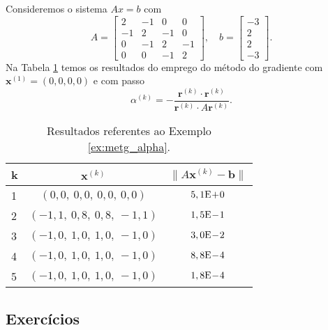 \begin{ex}\label{ex:metg_alpha}
  Consideremos o sistema $Ax = b$ com
  \begin{equation}
    A =
    \begin{bmatrix}
      2 & -1 & 0 & 0\\
      -1 & 2 & -1 & 0\\
      0 & -1 & 2 & -1 \\
      0 & 0 & -1 & 2
    \end{bmatrix},\quad
    b =
    \begin{bmatrix}
      -3\\
      2\\
      2\\
      -3
    \end{bmatrix}.
  \end{equation}
  Na Tabela \ref{tab:metg_alpha} temos os resultados do emprego do método do gradiente com $\pmb{x}^{(1)} = (0, 0, 0, 0)$ e com passo
  \begin{equation}
    \alpha^{(k)} = - \frac{\pmb{r}^{(k)}\cdot\pmb{r}^{(k)}}{\pmb{r}^{(k)}\cdot A\pmb{r}^{(k)}}.
\end{equation}

  \begin{table}[h!]
    \centering
    \caption{Resultados referentes ao Exemplo \ref{ex:metg_alpha}.}
    \label{tab:metg_alpha}
    \begin{tabular}{l|c|c}
      k & $\pmb{x}^{(k)}$ & $\|A\pmb{x}^{(k)}-\pmb{b}\|$\\\hline
      1 & $(0,0,~0,0,~0,0,~0,0)$ & $5,1\mathrm{E}\!+\!0$\\
      2 & $(-1,1,~0,8,~0,8,~-1,1)$ & $1,5\mathrm{E}\!-\!1$\\
      3 & $(-1,0,~1,0,~1,0,~-1,0)$ & $3,0\mathrm{E}\!-\!2$\\
      4 & $(-1,0,~1,0,~1,0,~-1,0)$ & $8,8\mathrm{E}\!-\!4$\\
      5 & $(-1,0,~1,0,~1,0,~-1,0)$ & $1,8\mathrm{E}\!-\!4$\\\hline
    \end{tabular}
  \end{table}

% 
\end{ex}

\subsection*{Exercícios}

